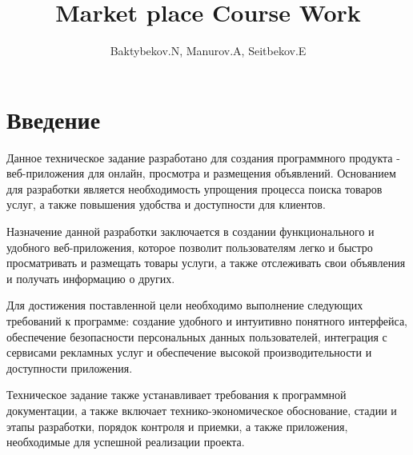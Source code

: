 
\title{Market place Course Work}

\author{Baktybekov.N, Manurov.A, Seitbekov.E}



\maketitle

\newpage
\tableofcontents{}
\setcounter{page}{1}

\newpage
{}


\section*{Введение}

Данное техническое задание разработано для создания программного продукта - веб-приложения для онлайн, просмотра и размещения объявлений. Основанием для разработки является необходимость упрощения процесса поиска товаров услуг, а также повышения удобства и доступности для клиентов.

Назначение данной разработки заключается в создании функционального и удобного веб-приложения, которое позволит пользователям легко и быстро просматривать и размещать товары услуги, а также отслеживать свои объявления и получать информацию о других.

Для достижения поставленной цели необходимо выполнение следующих требований к программе: создание удобного и интуитивно понятного интерфейса, обеспечение безопасности персональных данных пользователей, интеграция с сервисами рекламных услуг и обеспечение высокой производительности и доступности приложения.

Техническое задание также устанавливает требования к программной документации, а также включает технико-экономическое обоснование, стадии и этапы разработки, порядок контроля и приемки, а также приложения, необходимые для успешной реализации проекта.









